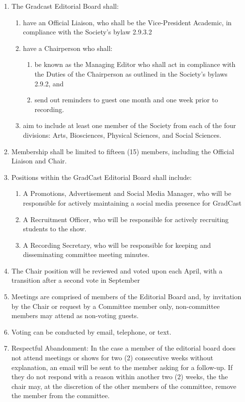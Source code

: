 \begin{enumerate} [label*=\arabic*., align=left]	
\item The Gradcast Editorial Board shall: 
\begin{enumerate}[label*=\arabic*., align=left]	
\item have an Official Liaison, who shall be the Vice-President Academic, in compliance with the Society's bylaw 2.9.3.2 
\item have a Chairperson who shall:
\begin{enumerate}
\item be known as the Managing Editor who shall act in compliance with the Duties of the Chairperson as outlined in the Society's bylaws 2.9.2, and 
\item send out reminders to guest one month and one week prior to recording.
\end{enumerate}

\item  aim to include at least one member of the Society from each of the four divisions: Arts, Biosciences, Physical Sciences, and Social Sciences.
\end{enumerate}

\item Membership shall be limited to fifteen (15) members, including the Official Liaison and Chair.
\item Positions within the GradCast Editorial Board shall include:
\begin{enumerate}[label*=\arabic*., align=left]	
\item A Promotions, Advertisement and Social Media Manager, who will be responsible
for actively maintaining a social media presence for GradCast
\item A Recruitment Officer, who will be responsible for actively recruiting students to the
show.
\item A Recording Secretary, who will be responsible for keeping and disseminating
committee meeting minutes.
\end{enumerate}
\item The Chair position will be reviewed and voted upon each April, with a transition after a second vote in September
\item Meetings are comprised of members of the Editorial Board and, by invitation by the Chair or request by a Committee member only, non-committee members may attend as non-voting guests.
\item Voting can be conducted by email, telephone, or text.
\item Respectful Abandonment: In the case a member of the editorial board does not attend meetings
or shows for two (2) consecutive weeks without explanation, an email will be sent to the member asking for a follow-up. If they do not respond with a reason within another two (2) weeks, the the chair may, at the discretion of the other members of the committee, remove the member from the committee.
\end{enumerate}



